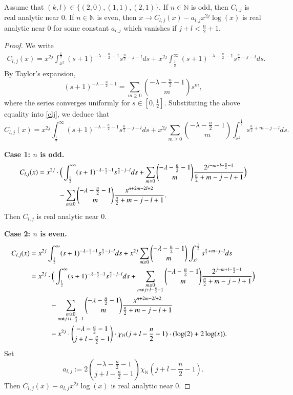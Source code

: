 \documentclass{amsart}
\begin{document}
\begin{lemma}\label{third fkl lemma} Assume that $(k,l)\in\{(2,0),(1,1),(2,1)\}$. If $n\in\mathbb{N}$ is odd, then $C_{l,j}$ is real analytic near $0.$ If $n\in\mathbb{N}$ is even, then $x\to C_{l,j}(x)-a_{l,j}x^{2j}\log(x)$ is real analytic near $0$ for some constant $a_{l,j}$ which vanishes if $j+l<\frac{n}{2}+1.$
\end{lemma}
\begin{proof} We write
\begin{align}\label{clj}
C_{l,j}(x)=x^{2j}\int_{x^2}^{\frac12}(s+1)^{-\lambda-\frac{n}{2}-1}s^{\frac{n}{2}-j-l}ds+x^{2j}\int_{\frac12}^{\infty}(s+1)^{-\lambda-\frac{n}{2}-1}s^{\frac{n}{2}-j-l}ds.
\end{align}
By Taylor's expansion,
$$(s+1)^{-\lambda-\frac{n}{2}-1}=\sum_{m\geq0}\binom{-\lambda-\frac{n}{2}-1}{m}s^m,$$
where the series converges uniformly for $s\in[0,\frac12].$ Substituting the above equality into \eqref{clj}, we deduce that
$$C_{l,j}(x)=x^{2j}\int_{\frac12}^{\infty}(s+1)^{-\lambda-\frac{n}{2}-1}s^{\frac{n}{2}-j-l}ds+x^{2j}\sum_{m\geq0}\binom{-\lambda-\frac{n}{2}-1}{m}\int_{x^2}^{\frac12}s^{\frac{n}{2}+m-j-l}ds.$$

{\bf Case 1:  $n$ is odd.}
\begin{align*}
C_{l,j}(x)&=x^{2j}\cdot\Big( \int_{\frac12}^{\infty}(s+1)^{-\lambda-\frac{n}{2}-1}s^{\frac{n}{2}-j-l}ds+\sum_{m\geq0}\binom{-\lambda-\frac{n}{2}-1}{m}\frac{2^{j-m+l-\frac{n}{2}-1}}{\frac{n}{2}+m-j-l+1}\Big)\\
&\hspace{1.0cm}-\sum_{m\geq0}\binom{-\lambda-\frac{n}{2}-1}{m}\frac{x^{n+2m-2l+2}}{\frac{n}{2}+m-j-l+1}.
\end{align*}
Then $C_{l,j}$ is real analytic near $0.$

{\bf Case 2:  $n$ is even.}
\begin{align*}
C_{l,j}(x)&=x^{2j}\int_{\frac12}^{\infty}(s+1)^{-\lambda-\frac{n}{2}-1}s^{\frac{n}{2}-j-l}ds+x^{2j}\sum_{m\geq0}\binom{-\lambda-\frac{n}{2}-1}{m}\int_{x^2}^{\frac12}s^{\frac{n}{2}+m-j-l}ds\\
&=x^{2j}\cdot\Big( \int_{\frac12}^{\infty}(s+1)^{-\lambda-\frac{n}{2}-1}s^{\frac{n}{2}-j-l}ds+\sum_{\substack{m\geq0\\ m\neq j+l-\frac{n}{2}-1}}\binom{-\lambda-\frac{n}{2}-1}{m}\frac{2^{j-m+l-\frac{n}{2}-1}}{\frac{n}{2}+m-j-l+1}\Big)\\
&\hspace{1.0cm}-\sum_{\substack{m\geq0\\ m\neq j+l-\frac{n}{2}-1}}\binom{-\lambda-\frac{n}{2}-1}{m}\frac{x^{n+2m-2l+2}}{\frac{n}{2}+m-j-l+1}\\
&\hspace{1.0cm}-x^{2j}\cdot \binom{-\lambda-\frac{n}{2}-1}{j+l-\frac{n}{2}-1}\cdot\chi_{\mathbb{N}}(j+l-\frac{n}{2}-1)\cdot (\log(2)+2\log(x)).
\end{align*}
Set $$a_{l,j}:=2\binom{-\lambda-\frac{n}{2}-1}{j+l-\frac{n}{2}-1}\chi_{\mathbb{N}}(j+l-\frac{n}{2}-1).$$
Then $C_{l,j}(x)-a_{l,j}x^{2j}\log(x)$ is real analytic near $0.$
\end{proof}
\end{document}
